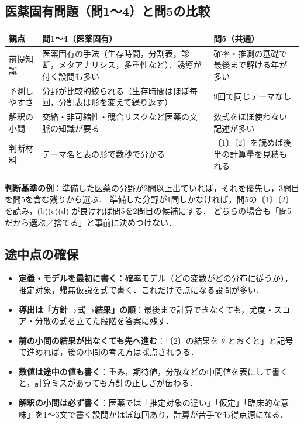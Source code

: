 \documentclass[a4paper,11pt,openany]{ltjsbook}
\begin{document}
\subsection{医薬固有問題（問1〜4）と問5の比較}
\begin{center}\small
\begin{tabular}{@{}L{32mm}L{53mm}L{53mm}@{}}
\toprule
観点 & 問1〜4（医薬固有） & 問5（共通）\\
\midrule
前提知識 & 医薬固有の手法（生存時間，分割表，診断，メタアナリシス，多重性など）．誘導が付く設問も多い & 確率・推測の基礎で最後まで解ける年が多い\\
予測しやすさ & 分野が比較的絞られる（生存時間はほぼ毎回，分割表は形を変えて繰り返す） & 9回で同じテーマなし\\
解釈の小問 & 交絡・非可縮性・競合リスクなど医薬の文脈の知識が要る & 数式をほぼ使わない記述が多い\\
判断材料 & テーマ名と表の形で数秒で分かる & 〔1〕〔2〕を読めば後半の計算量を見積もれる\\
\bottomrule
\end{tabular}
\end{center}
\textbf{判断基準の例}：準備した医薬の分野が2問以上出ていれば，それを優先し，3問目を問5を含む残りから選ぶ．
準備した分野が1問しかなければ，問5の〔1〕〔2〕を読み，(b)(c)(d) が良ければ問5を2問目の候補にする．
どちらの場合も「問5だから選ぶ／捨てる」と事前に決めつけない．

\subsection{途中点の確保}
\begin{itemize}
\item \textbf{定義・モデルを最初に書く}：確率モデル（どの変数がどの分布に従うか），推定対象，帰無仮説を式で書く．これだけで点になる設問が多い．
\item \textbf{導出は「方針→式→結果」の順}：最後まで計算できなくても，尤度・スコア・分散の式を立てた段階を答案に残す．
\item \textbf{前の小問の結果が出なくても先へ進む}：「〔2〕の結果を $\hat\theta$ とおくと」と記号で進めれば，後の小問の考え方は採点されうる．
\item \textbf{数値は途中の値も書く}：重み，期待値，分散などの中間値を表にして書くと，計算ミスがあっても方針の正しさが伝わる．
\item \textbf{解釈の小問は必ず書く}：医薬では「推定対象の違い」「仮定」「臨床的な意味」を1〜3文で書く設問がほぼ毎回あり，計算が苦手でも得点源になる．
\end{itemize}
\end{document}
